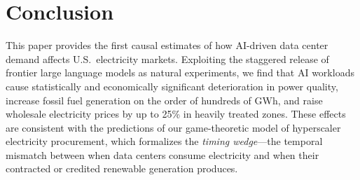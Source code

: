 \documentclass[a4paper,fleqn,longmktitle]{cas-sc}
\begin{document}




\section{Conclusion}\label{sec:conclusion_aipower}

This paper provides the first causal estimates of how AI-driven data center demand affects U.S.\ electricity markets. Exploiting the staggered release of frontier large language models as natural experiments, we find that AI workloads cause statistically and economically significant deterioration in power quality, increase fossil fuel generation on the order of hundreds of GWh, and raise wholesale electricity prices by up to 25\% in heavily treated zones. These effects are consistent with the predictions of our game-theoretic model of hyperscaler electricity procurement, which formalizes the \emph{timing wedge}---the temporal mismatch between when data centers consume electricity and when their contracted or credited renewable generation produces.
\end{document}
